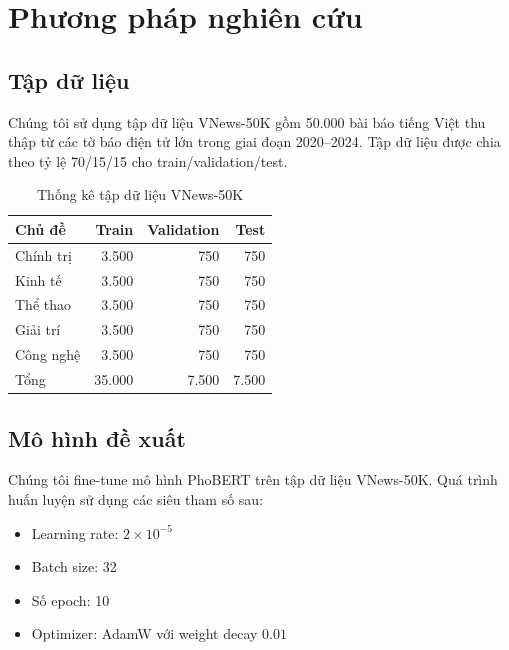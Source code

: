 \documentclass[12pt, a4paper]{report}
\begin{document}
\chapter{Phương pháp nghiên cứu}
\label{chap:method}

\section{Tập dữ liệu}

Chúng tôi sử dụng tập dữ liệu VNews-50K gồm 50.000 bài báo tiếng Việt
thu thập từ các tờ báo điện tử lớn trong giai đoạn 2020--2024. Tập dữ liệu
được chia theo tỷ lệ 70/15/15 cho train/validation/test.

\begin{table}[htbp]
  \centering
  \caption{Thống kê tập dữ liệu VNews-50K}
  \label{tab:dataset}
  \begin{tabularx}{\textwidth}{Xrrr}
    \toprule
    Chủ đề & Train & Validation & Test \\
    \midrule
    Chính trị  & 3.500 & 750 & 750 \\
    Kinh tế    & 3.500 & 750 & 750 \\
    Thể thao   & 3.500 & 750 & 750 \\
    Giải trí   & 3.500 & 750 & 750 \\
    Công nghệ  & 3.500 & 750 & 750 \\
    \midrule
    Tổng       & 35.000 & 7.500 & 7.500 \\
    \bottomrule
  \end{tabularx}
\end{table}

\section{Mô hình đề xuất}

Chúng tôi fine-tune mô hình PhoBERT \cite{Le2024bert} trên tập dữ liệu
VNews-50K. Quá trình huấn luyện sử dụng các siêu tham số sau:

\begin{itemize}
  \item Learning rate: $2 \times 10^{-5}$
  \item Batch size: 32
  \item Số epoch: 10
  \item Optimizer: AdamW với weight decay $0.01$
\end{itemize}

\end{document}
